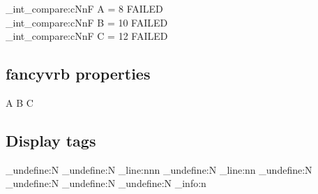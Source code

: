 \ExplSyntaxOn
\CDR_int_compare:cNnF { A } = 8 { FAILED \\ }
\CDR_int_compare:cNnF { B } = {10} { FAILED \\ }
\CDR_int_compare:cNnF { C } = {12} { FAILED \\ }
\ExplSyntaxOff

\subsection{\textsf{fancyvrb} properties}

\begin{CDRBlock} [
  tags=none,
  numbers=left,
  firstnumber=last,
]
A
B
C
\end{CDRBlock}

\newpage

\subsection{Display tags}

\makeatletter
\ExplSyntaxOn

\cs_undefine:N \CDR@Line
\cs_undefine:N \CDR_line:nnn
\cs_undefine:N \CDR_line:nn
\cs_undefine:N \CDR@NumberFormat
\cs_undefine:N \CDR@TagsFormat
\cs_undefine:N \CDR@NumberSep
\cs_undefine:N \CDR_info:n


